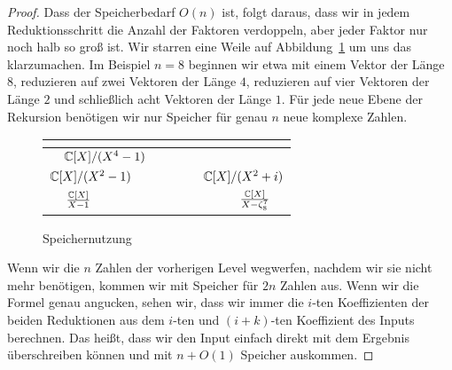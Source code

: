\begin{proof}
    \medskip
    Dass der Speicherbedarf $O(n)$ ist, folgt daraus, dass wir in jedem Reduktionsschritt die Anzahl der Faktoren verdoppeln, aber jeder Faktor nur noch halb so groß ist. Wir starren eine Weile auf Abbildung~\ref{fig:fft:memory_n_equals_8} um uns das klarzumachen. Im Beispiel $n=8$ beginnen wir etwa mit einem Vektor der Länge $8$, reduzieren auf zwei Vektoren der Länge $4$, reduzieren auf vier Vektoren der Länge $2$ und schließlich acht Vektoren der Länge $1$. Für jede neue Ebene der Rekursion benötigen wir nur Speicher für genau $n$ neue komplexe Zahlen.
    \begin{figure}[htb]
        \begin{tabular}{|C{0.125}|C{0.125}|C{0.125}|C{0.125}|C{0.125}|C{0.125}|C{0.125}|C{0.125}|}
            \hline
             \\
            \hline
             &
             \\
            \hline
             &
             &
             &
             \\
            \hline
                          {$\frac{\mathbb{C}[X]}{X-1}$} &
             &
             &
             &
             &
             &
             &
                   {$\frac{\mathbb{C}[X]}{X-\zeta_8^7}$} \\
            \hline
        \end{tabular}
        \caption{Speichernutzung}
        \label{fig:fft:memory_n_equals_8}
    \end{figure}

    Wenn wir die $n$ Zahlen der vorherigen Level wegwerfen, nachdem wir sie nicht mehr benötigen, kommen wir mit Speicher für $2n$ Zahlen aus. Wenn wir die Formel genau angucken, sehen wir, dass wir immer die $i$-ten Koeffizienten der beiden Reduktionen aus dem $i$-ten und $(i+k)$-ten Koeffizient des Inputs berechnen. Das heißt, dass wir den Input einfach direkt mit dem Ergebnis überschreiben können und mit $n+O(1)$ Speicher auskommen.
\end{proof}